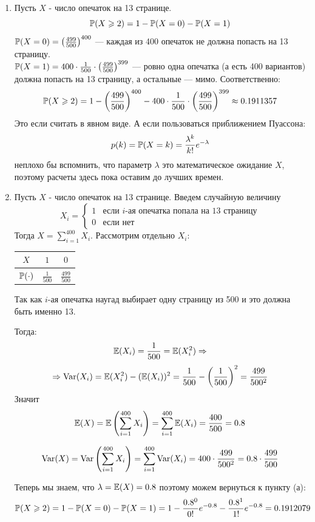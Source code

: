 \documentclass[12pt, a4paper]{article}\usepackage[]{graphicx}\usepackage[]{color}
\begin{document}
\begin{enumerate}
\begin{enumerate}
\item Пусть $X$ - число опечаток на 13 странице. \[\P(X \geqslant 2) = 1 - \P(X=0) - \P(X=1) \]
$\P(X=0) = \left( \frac{499}{500} \right)^{400}$ — каждая из 400 опечаток не должна попасть на 13 страницу.\\
$\P(X=1) = 400\cdot\frac{1}{500}\cdot\left( \frac{499}{500} \right)^{399}$ — ровно одна опечатка (а есть 400 вариантов) должна попасть на 13 страницу, а остальные — мимо. Соответственно:
\[
\P(X \geqslant 2) = 1 - \left( \frac{499}{500} \right)^{400} - 400\cdot\frac{1}{500}\cdot\left( \frac{499}{500} \right)^{399} \approx 0.1911357
\]
Это если считать в явном виде. А если пользоваться приближением Пуассона:
\[
p(k) = \P(X = k) = \frac{\lambda^k}{k!}e^{-\lambda}
\]
неплохо бы вспомнить, что параметр $\lambda$ это математическое ожидание $X$, поэтому расчеты здесь пока оставим до лучших времен.

\item Пусть $X$ - число опечаток на 13 странице. Введем случайную величину
\[X_i =
\begin{cases}
1 & \text{если } i\text{-ая опечатка попала на 13 страницу}\\
0 & \text{если нет}
\end{cases}
\]
Тогда $X = \sum\limits_{i=1}^{400}X_i$. Рассмотрим отдельно $X_i$:

\begin{tabular}{@{}ccc@{}}
\toprule
$X$         & $1$             & $0$               \\ \midrule
$\P(\cdot)$ & $\frac{1}{500}$ & $\frac{499}{500}$ \\ \bottomrule
\end{tabular}

Так как $i$-ая опечатка наугад выбирает одну страницу из 500 и это должна быть именно 13.

Тогда:
\[
\E(X_i) = \frac{1}{500} = \E(X^2_i) \Rightarrow
\]
\[
\Rightarrow \Var(X_i) = \E(X^2_i) - (\E(X_i))^2 = \frac{1}{500} - \left(\frac{1}{500}\right)^2 = \frac{499}{500^2}
\]
Значит
\[
\E(X) = \E\left(\sum\limits_{i=1}^{400}X_i\right) = \sum\limits_{i=1}^{400}\E(X_i)  = \frac{400}{500} = 0.8
\]

\[
\Var(X) = \Var\left(\sum\limits_{i=1}^{400}X_i\right) = \sum\limits_{i=1}^{400}\Var(X_i) = 400\cdot\frac{499}{500^2} = 0.8\cdot\frac{499}{500}
\]

Теперь мы знаем, что $\lambda = \E(X) = 0.8$ поэтому можем вернуться к пункту (а):
\[
\P(X \geqslant 2) = 1 - \P(X=0) - \P(X=1)  = 1 - \frac{0.8^0}{0!}e^{-0.8} - \frac{0.8^1}{1!}e^{-0.8} = 0.1912079
\] \vspace{-1.2cm}


\end{enumerate}
\end{enumerate}
\end{document}
